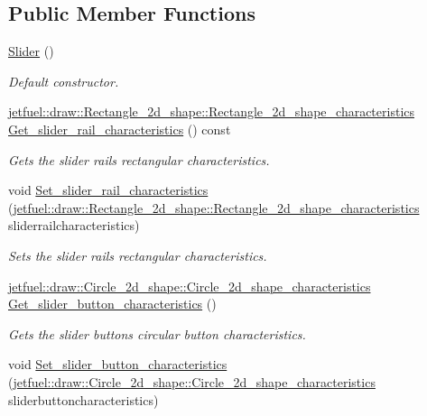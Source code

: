 \subsection*{Public Member Functions}
\begin{DoxyCompactItemize}
\item 
\hyperlink{classjetfuel_1_1gui_1_1Slider_a961a11496cee6ab2f38aef1e14e94922}{Slider} ()
\begin{DoxyCompactList}\small\item\em Default constructor. \end{DoxyCompactList}\item 
\hyperlink{structjetfuel_1_1draw_1_1Rectangle__2d__shape_1_1Rectangle__2d__shape__characteristics}{jetfuel\+::draw\+::\+Rectangle\+\_\+2d\+\_\+shape\+::\+Rectangle\+\_\+2d\+\_\+shape\+\_\+characteristics} \hyperlink{classjetfuel_1_1gui_1_1Slider_aa7ca69b0cac43c29a9df8b2215c073bc}{Get\+\_\+slider\+\_\+rail\+\_\+characteristics} () const
\begin{DoxyCompactList}\small\item\em Gets the slider rail\textquotesingle{}s rectangular characteristics. \end{DoxyCompactList}\item 
void \hyperlink{classjetfuel_1_1gui_1_1Slider_a2cd13b87b896c03771bcdc29df1e1fc6}{Set\+\_\+slider\+\_\+rail\+\_\+characteristics} (\hyperlink{structjetfuel_1_1draw_1_1Rectangle__2d__shape_1_1Rectangle__2d__shape__characteristics}{jetfuel\+::draw\+::\+Rectangle\+\_\+2d\+\_\+shape\+::\+Rectangle\+\_\+2d\+\_\+shape\+\_\+characteristics} sliderrailcharacteristics)
\begin{DoxyCompactList}\small\item\em Sets the slider rail\textquotesingle{}s rectangular characteristics. \end{DoxyCompactList}\item 
\hyperlink{structjetfuel_1_1draw_1_1Circle__2d__shape_1_1Circle__2d__shape__characteristics}{jetfuel\+::draw\+::\+Circle\+\_\+2d\+\_\+shape\+::\+Circle\+\_\+2d\+\_\+shape\+\_\+characteristics} \hyperlink{classjetfuel_1_1gui_1_1Slider_a179af5f98738a5011b8608e656fdb090}{Get\+\_\+slider\+\_\+button\+\_\+characteristics} ()
\begin{DoxyCompactList}\small\item\em Gets the slider button\textquotesingle{}s circular button characteristics. \end{DoxyCompactList}\item 
void \hyperlink{classjetfuel_1_1gui_1_1Slider_a1d83644e298afe4153c00203ab493397}{Set\+\_\+slider\+\_\+button\+\_\+characteristics} (\hyperlink{structjetfuel_1_1draw_1_1Circle__2d__shape_1_1Circle__2d__shape__characteristics}{jetfuel\+::draw\+::\+Circle\+\_\+2d\+\_\+shape\+::\+Circle\+\_\+2d\+\_\+shape\+\_\+characteristics} sliderbuttoncharacteristics)

\end{DoxyCompactItemize}
